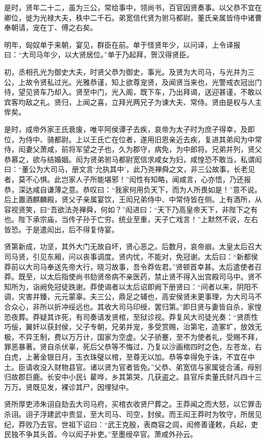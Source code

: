 \documentclass[]{article}
\begin{document}
是时，贤年二十二，虽为三公，常给事中，领尚书，百官因贤奏事。以父恭不宜在卿位，徙为光禄大夫，秩中二千石。弟宽信代贤为驸马都尉。董氏亲属皆侍中诸曹奉朝请，宠在丁、傅之右矣。

明年，匈奴单于来朝，宴见，群臣在前。单于怪贤年少，以问译，上令译报曰：``大司马年少，以大贤居位。''单于乃起拜，贺汉得贤臣。

初，丞相孔光为御史大夫，时贤父恭为御史，事光。及贤为大司马，与光并为三公，上故令贤私过光。光雅恭谨，知上欲尊宠贤，及闻贤当来也，光警戒衣冠出门待，望见贤车乃却入。贤至中门，光入阁，既下车，乃出拜谒，送迎甚谨，不敢以宾客均敌之礼。贤归，上闻之喜，立拜光两兄子为谏大夫、常侍。贤由是权与人主侔矣。

是时，成帝外家王氏衰废，唯平阿侯谭子去疾，哀帝为太子时为庶子得幸，及即位，为侍中、骑都尉。上以王氏亡在位者，遂用旧恩亲近去疾，复进其弟闳为中常侍，闳妻父萧咸，前将军望之子也，久为郡守，病免，为中郎将。兄弟并列，贤父恭慕之，欲与结婚姻。闳为贤弟驸马都尉宽信求咸女为妇，咸惶恐不敢当，私谓闳曰：``董公为大司马，册文言`允执其中'，此乃尧禅舜之文，非三公故事，长老见者，莫不心惧。此岂家人子所能堪邪！''闳性有知略，闻咸言，心亦悟，乃还报恭，深达咸自谦薄之意。恭叹曰：``我家何用负天下，而为人所畏如是！''意不说。后上置酒麒麟殿，贤父子亲属宴饮，王闳兄弟侍中、中常侍皆在侧。上有酒所，从容视贤笑，曰``吾欲法尧禅舜，何如？''闳进曰：``天下乃高皇帝天下，非陛下之有也。陛下承宗庙，当传子孙于亡穷。统业至重，天子亡戏言！''上默然不说，左右皆恐。于是遣闳出，后不得复侍宴。

贤第新成，功坚，其外大门无故自坏，贤心恶之。后数月，哀帝崩。太皇太后召大司马贤，引见东厢，问以丧事调度。贤内忧，不能对，免冠谢。太后曰：``新都侯莽前以大司马奉送先帝大行，晓习故事，吾令莽佐君。''贤顿首幸甚。太后遣使者召莽。既至，以太后指使尚书劾贤帝病不亲医药，禁止贤不得入出宫殿司马中。贤不知所为，诣阙免冠徒跣谢。莽使谒者以太后诏即阙下册贤曰：``间者以来，阴阳不调，灾害并臻，元元蒙辜。夫三公，鼎足之辅也，高安侯贤未更事理，为大司马不合众心，非所以折冲绥远也。其收大司马印绶，罢归第。''即日贤与妻皆自杀，家惶恐夜葬。莽疑其诈死，有司奏请发贤棺，至狱诊视。莽复风大司徒光奏：``贤质性巧佞，翼奸以获封侯，父子专朝，兄弟并宠，多受赏赐，治第宅，造冢圹，放效无极，不异王制，费以万万计，国家为空虚。父子骄蹇，至不为使者礼，受赐不拜，罪恶暴著。贤自杀伏辜，死后父恭等不悔过，乃复以沙画棺四时之色，左苍龙，右白虎，上著金银日月，玉衣珠璧以棺，至尊无以加。恭等幸得免于诛，不宜在中土。臣请收没入财物县官。诸以贤为官者皆免。''父恭、弟宽信与家属徙合浦，母别归故郡巨鹿。长安中小民讠雚哗，乡其第哭，几获盗之。县官斥卖董氏财凡四十三万万。贤既见发，裸诊其尸，因埋狱中。

贤所厚吏沛朱诩自劾去大司马府，买棺衣收贤尸葬之。王莽闻之而大怒，以它罪击杀诩。诩子浮建武中贵显，至大司马、司空，封侯。而王闳王莽时为牧守，所居见纪，莽败乃去官。世祖下诏曰：``武王克殷，表商容之闾，闳修善谨敕，兵起，吏民独不争其头首。今以闳子补吏。''至墨绶卒官。萧咸外孙云。
\end{document}
